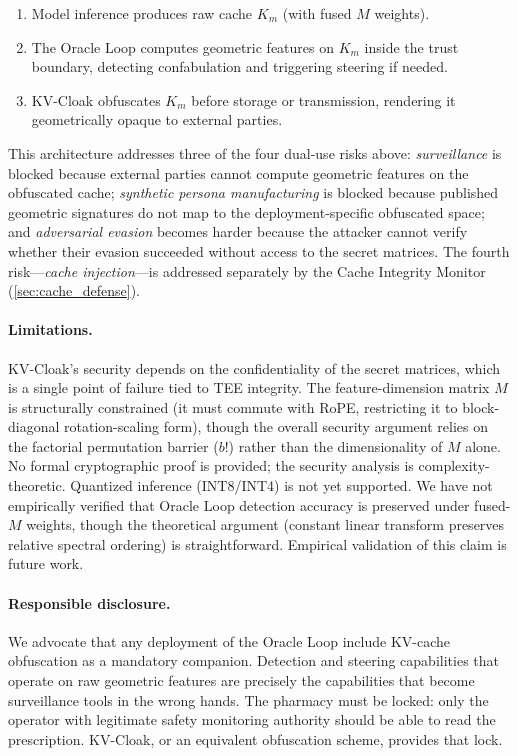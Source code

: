 \begin{enumerate}[nosep]
  \item Model inference produces raw cache $K_m$ (with fused $M$ weights).
  \item The Oracle Loop computes geometric features on $K_m$ inside the
    trust boundary, detecting confabulation and triggering steering if
    needed.
  \item KV-Cloak obfuscates $K_m$ before storage or transmission,
    rendering it geometrically opaque to external parties.
\end{enumerate}

This architecture addresses three of the four dual-use risks above:
\emph{surveillance} is blocked because external parties cannot compute
geometric features on the obfuscated cache; \emph{synthetic persona
manufacturing} is blocked because published geometric signatures do not
map to the deployment-specific obfuscated space; and \emph{adversarial
evasion} becomes harder because the attacker cannot verify whether their
evasion succeeded without access to the secret matrices. The fourth
risk---\emph{cache injection}---is addressed separately by the Cache
Integrity Monitor (\cref{sec:cache_defense}).

\paragraph{Limitations.}
KV-Cloak's security depends on the confidentiality of the secret matrices,
which is a single point of failure tied to TEE integrity. The
feature-dimension matrix $M$ is structurally constrained (it must commute
with RoPE, restricting it to block-diagonal rotation-scaling form), though
the overall security argument relies on the factorial permutation
barrier ($b!$) rather than the dimensionality of $M$ alone. No formal cryptographic proof is provided;
the security analysis is complexity-theoretic. Quantized inference
(INT8/INT4) is not yet supported. We have not empirically verified that
Oracle Loop detection accuracy is preserved under fused-$M$ weights,
though the theoretical argument (constant linear transform preserves
relative spectral ordering) is straightforward. Empirical validation of
this claim is future work.

\paragraph{Responsible disclosure.}
We advocate that any deployment of the Oracle Loop include KV-cache
obfuscation as a mandatory companion. Detection and steering capabilities
that operate on raw geometric features are precisely the capabilities that
become surveillance tools in the wrong hands. The pharmacy must be locked:
only the operator with legitimate safety monitoring authority should be
able to read the prescription. KV-Cloak, or an equivalent obfuscation
scheme, provides that lock.

